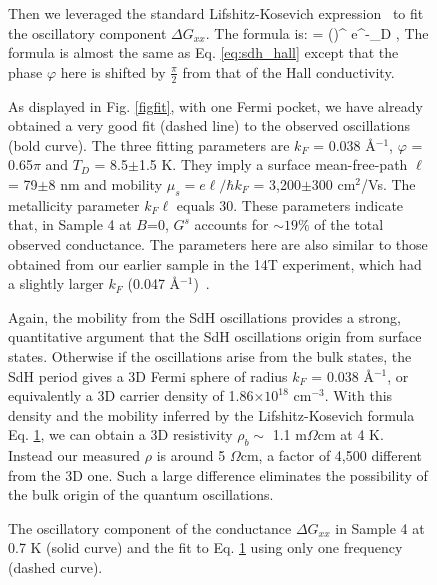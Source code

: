 
\begin{figure}[!htbp]
  \begin{center}   
\caption{\label{figfit} 
The oscillatory component of the conductance $\Delta G_{xx}$ in Sample 4 at 0.7 K
(solid curve) and the fit to Eq. \ref{eq:sdh} using only one frequency (dashed curve). 
}
  \end{center}
\efig

Then we leveraged the standard Lifshitz-Kosevich expression~\cite{Roth} to fit the oscillatory component $\Delta G_{xx}$. The formula is:
\be
{} = \left(\right)^{}
\frac{\lambda}{\sinh\lambda} e^{-\lambda_D}\cos
{},
\label{eq:sdh}
\ee
The formula is almost the same as Eq. \ref{eq:sdh_hall} except that the phase $\varphi$ here is shifted by $\frac{\pi}{2}$ from that of the Hall conductivity. 


As displayed in Fig. \ref{figfit}, with one Fermi pocket, we have already obtained a very good fit (dashed line) to the observed oscillations (bold curve). The three fitting parameters are $k_F$ = 0.038 \AA$^{-1}$, $\varphi$ = 0.65$\pi$ and
$T_D$ = 8.5$\pm$1.5 K. They imply a surface 
mean-free-path $\ell$ = 79$\pm$8 nm and mobility $\mu_s = e\ell/\hbar k_F$ = 3,200$\pm$300 cm$^2$/Vs.
The metallicity parameter $k_F\ell$ equals 30. 
These parameters indicate that, in Sample 4 at $B$=0, $G^s$ accounts for $\sim 19\%$ of the
total observed conductance.
The parameters here are also similar to those obtained from our earlier
sample in the 14T experiment, which had a slightly larger $k_F$ (0.047 \AA$^{-1}$)~\cite{Xiong2012}. 


Again, the mobility from the SdH oscillations provides a strong, quantitative argument that the SdH oscillations
origin from surface states. Otherwise if the oscillations arise 
from the bulk states, the SdH period gives a 3D Fermi sphere 
of radius $k_F$ = 0.038 \AA$^{-1}$, or equivalently a 3D carrier density of 1.86$\times 10^{18}$ cm$^{-3}$.  With
this density and the mobility inferred by the Lifshitz-Kosevich formula Eq. \ref{eq:sdh}, we can obtain a 3D resistivity $\rho_b \sim$ 1.1 m$\Omega$cm at 4 K. Instead our measured $\rho$ is around 5 $\Omega$cm, a factor of 4,500 different from the 3D one. Such a large difference eliminates the possibility of the bulk origin of the quantum oscillations.



\end{figure}
